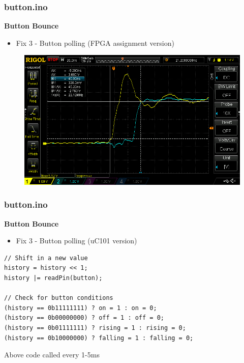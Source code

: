 \documentclass[t]{beamer}
\begin{document}

\begin{frame}[t]
\frametitle{button.ino}
\textbf{Button Bounce}
\begin{itemize}
	\item Fix 3 - Button polling (FPGA assignment version)
\end{itemize}
\begin{figure}
	\includegraphics[scale=0.3]{riseDelay.png}
\end{figure}
\end{frame}


\begin{frame}[t,fragile]
\frametitle{button.ino}
\textbf{Button Bounce}
\begin{itemize}
	\item Fix 3 - Button polling (uC101 version)
\end{itemize}
\begin{verbatim}
// Shift in a new value
history = history << 1;
history |= readPin(button);

// Check for button conditions
(history == 0b11111111) ? on = 1 : on = 0;
(history == 0b00000000) ? off = 1 : off = 0;
(history == 0b01111111) ? rising = 1 : rising = 0;
(history == 0b10000000) ? falling = 1 : falling = 0;
\end{verbatim}
Above code called every 1-5ms

\end{frame}

\end{document}
